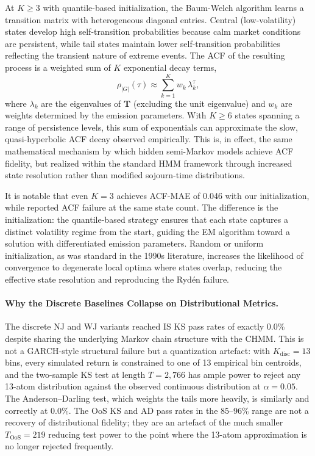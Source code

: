 At $K \geq 3$ with quantile-based initialization, the Baum-Welch algorithm learns a transition matrix with heterogeneous diagonal entries.
Central (low-volatility) states develop high self-transition probabilities because calm market conditions are persistent, while tail states maintain lower self-transition probabilities reflecting the transient nature of extreme events.
The ACF of the resulting process is a weighted sum of $K$ exponential decay terms,
\begin{equation}
    \rho_{|G|}(\tau) \approx \sum_{k=1}^{K} w_k \, \lambda_k^{\tau},
    \label{eq:acf_mixture}
\end{equation}
where $\lambda_k$ are the eigenvalues of $\mathbf{T}$ (excluding the unit eigenvalue) and $w_k$ are weights determined by the emission parameters.
With $K \geq 6$ states spanning a range of persistence levels, this sum of exponentials can approximate the slow, quasi-hyperbolic ACF decay observed empirically.
This is, in effect, the same mathematical mechanism by which hidden semi-Markov models \cite{bulla2006stylized} achieve ACF fidelity, but realized within the standard HMM framework through increased state resolution rather than modified sojourn-time distributions.

It is notable that even $K = 3$ achieves ACF-MAE of 0.046 with our initialization, while \citet{ryden1998stylized} reported ACF failure at the same state count.
The difference is the initialization: the quantile-based strategy ensures that each state captures a distinct volatility regime from the start, guiding the EM algorithm toward a solution with differentiated emission parameters.
Random or uniform initialization, as was standard in the 1990s literature, increases the likelihood of convergence to degenerate local optima where states overlap, reducing the effective state resolution and reproducing the Ryd\'{e}n failure.

\paragraph{Why the Discrete Baselines Collapse on Distributional Metrics.}
The discrete NJ and WJ variants reached IS KS pass rates of exactly 0.0\% despite sharing the underlying Markov chain structure with the CHMM.
This is not a GARCH-style structural failure but a quantization artefact: with $K_{\text{disc}} = 13$ bins, every simulated return is constrained to one of 13 empirical bin centroids, and the two-sample KS test at length $T = 2{,}766$ has ample power to reject any 13-atom distribution against the observed continuous distribution at $\alpha = 0.05$.
The Anderson--Darling test, which weights the tails more heavily, is similarly and correctly at 0.0\%.
The OoS KS and AD pass rates in the 85--96\% range are not a recovery of distributional fidelity; they are an artefact of the much smaller $T_{\text{OoS}} = 219$ reducing test power to the point where the 13-atom approximation is no longer rejected frequently.

